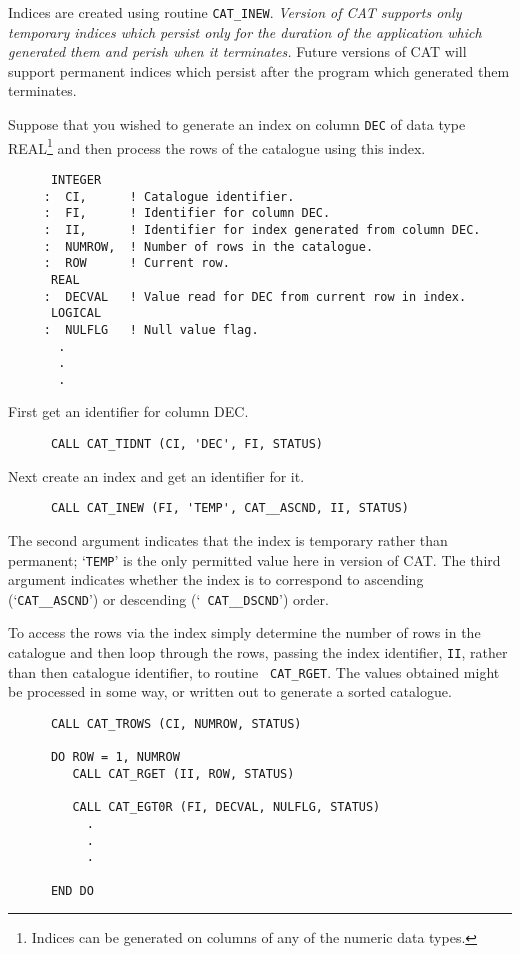 Indices are created using routine {\tt CAT\_INEW}. {\it Version
\CATversion of CAT supports only temporary indices which persist only
for the duration of the application which generated them and perish
when it terminates.} Future versions of CAT will support permanent
indices which persist after the program which generated them terminates.

Suppose that you wished to generate an index on column {\tt DEC} of data
type REAL\footnote{Indices can be generated on columns of any of the
numeric data types.} and then process the rows of the catalogue
using this index.

\begin{verbatim}
      INTEGER
     :  CI,      ! Catalogue identifier.
     :  FI,      ! Identifier for column DEC.
     :  II,      ! Identifier for index generated from column DEC.
     :  NUMROW,  ! Number of rows in the catalogue.
     :  ROW      ! Current row.
      REAL
     :  DECVAL   ! Value read for DEC from current row in index.
      LOGICAL
     :  NULFLG   ! Null value flag.
       .
       .
       .
\end{verbatim}

First get an identifier for column DEC.

\begin{verbatim}
      CALL CAT_TIDNT (CI, 'DEC', FI, STATUS)
\end{verbatim}

Next create an index and get an identifier for it.

\begin{verbatim}
      CALL CAT_INEW (FI, 'TEMP', CAT__ASCND, II, STATUS)
\end{verbatim}

The second argument indicates that the index is temporary rather than
permanent; `{\tt TEMP}' is the only permitted value here in version
\CATversion of CAT. The third argument indicates whether the index is to
correspond to ascending (`{\tt CAT\_\_ASCND}') or descending (`{\tt
CAT\_\_DSCND}') order.

To access the rows via the index simply determine the number of rows in
the catalogue and then loop through the rows, passing the index identifier,
{\tt II}, rather than then catalogue identifier, to routine {\tt
CAT\_RGET}. The values obtained might be processed in some way, or
written out to generate a sorted catalogue.

\begin{verbatim}
      CALL CAT_TROWS (CI, NUMROW, STATUS)

      DO ROW = 1, NUMROW
         CALL CAT_RGET (II, ROW, STATUS)

         CALL CAT_EGT0R (FI, DECVAL, NULFLG, STATUS)
           .
           .
           .

      END DO
\end{verbatim}


